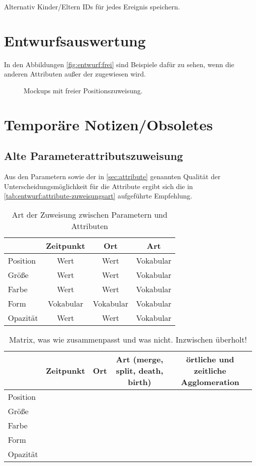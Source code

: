 Alternativ Kinder/Eltern IDs für jedes Ereignis speichern.


\chapter{Entwurfsauswertung}

In den Abbildungen \autoref{fig:entwurf:frei} sind Beispiele dafür zu sehen, wenn die  anderen Attributen außer der  zugewiesen wird.

\begin{figure}
	\caption{Mockups mit freier Positionszuweisung.}\label{fig:entwurf:frei}
\end{figure}

\chapter{Temporäre Notizen/Obsoletes}

\section{Alte Parameterattributszuweisung}

Aus den Parametern sowie der in \autoref{sec:attribute} genannten Qualität der Unterscheidungsmöglichkeit für die Attribute ergibt sich die in \autoref{tab:entwurf:attribute-zuweisungsart} aufgeführte Empfehlung.

\begin{table} 
	\begin{tabularx}{\textwidth}{@{}LCCC@{}}
		\toprule
		& Zeitpunkt & Ort & Art \tabularnewline
		\midrule
		Position & Wert & Wert & Vokabular \tabularnewline
		Größe & Wert & Wert & Vokabular \tabularnewline 
		Farbe & Wert & Wert & Vokabular \tabularnewline 
		Form & Vokabular & Vokabular & Vokabular \tabularnewline 
		Opazität & Wert & Wert & Vokabular \tabularnewline 
		\bottomrule
	\end{tabularx}
	\caption{Art der Zuweisung zwischen Parametern und Attributen}\label{tab:entwurf:attribute-zuweisungsart}
\end{table}


\begin{table}
	\begin{tabular}{l|ccc|c}
		& Zeitpunkt & Ort & Art (merge, split, death, birth) & örtliche und zeitliche Agglomeration \\
		\hline
		Position & \checkmark & \checkmark & \checkmark & \checkmark \\
		Größe & \checkmark & \kreuz & \checkmark & \checkmark \\
		Farbe & \checkmark & \kreuz & \checkmark & \checkmark \\
		Form & \kreuz & \kreuz & \checkmark & \checkmark \\
		Opazität & \checkmark & \kreuz & \checkmark & \checkmark \\
	\end{tabular}
	\caption{Matrix, was wie zusammenpasst und was nicht. Inzwischen überholt!}
\end{table}

